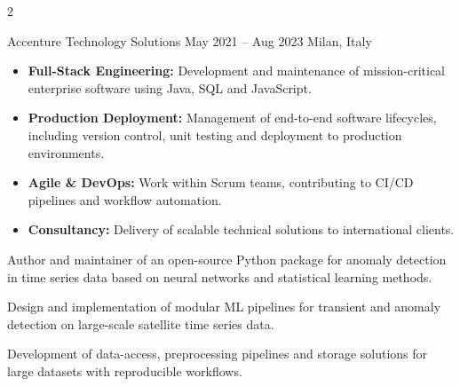 \documentclass[9pt,a4paper,withhyper,normalphoto]{altacv}
\begin{document}
\begin{paracol}{2}
\divider

{Accenture Technology Solutions}
{May 2021 -- Aug 2023}
{Milan, Italy}

\begin{itemize}
\item \textbf{Full-Stack Engineering:} Development and maintenance of mission-critical enterprise software using Java, SQL and JavaScript.
\item \textbf{Production Deployment:} Management of end-to-end software lifecycles, including version control, unit testing and deployment to production environments.
\item \textbf{Agile \& DevOps:} Work within Scrum teams, contributing to CI/CD pipelines and workflow automation.
\item \textbf{Consultancy:} Delivery of scalable technical solutions to international clients.
\end{itemize}


{Author and maintainer of an open-source Python package for anomaly detection in time series data based on neural networks and statistical learning methods.}

\divider

{Design and implementation of modular ML pipelines for transient and anomaly detection on large-scale satellite time series data.}

\divider

{Development of data-access, preprocessing pipelines and storage solutions for large datasets with reproducible workflows.}

\end{paracol}




\end{document}
